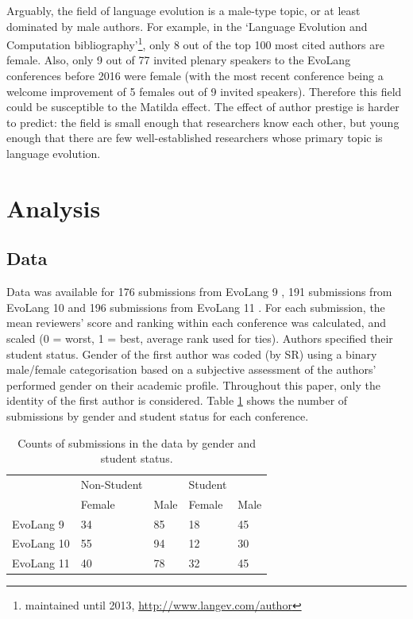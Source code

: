 \documentclass[12pt]{article}
\begin{document}
Arguably, the field of language evolution is a male-type topic, or at least dominated by male authors.  For example, in the `Language Evolution and Computation bibliography'\footnote{maintained until 2013, \url{http://www.langev.com/author}}, only 8 out of the top 100 most cited authors are female.  Also, only 9 out of 77 invited plenary speakers to the EvoLang conferences before 2016 were female (with the most recent conference being a welcome improvement of 5 females out of 9 invited speakers).  Therefore this field could be susceptible to the Matilda effect.  The effect of author prestige is harder to predict: the field is small enough that researchers know each other, but young enough that there are few well-established researchers whose primary topic is language evolution. 

\section{Analysis}

\subsection{Data}

Data was available for 176 submissions from EvoLang 9 \citep{scott2012evolution}, 191 submissions from EvoLang 10 \citep{cartmill2014evolution} and 196 submissions from EvoLang 11 \citep{roberts2016evolution}.  For each submission, the mean reviewers' score and ranking within each conference was calculated, and scaled (0 = worst, 1 = best, average rank used for ties).  Authors specified their student status.  Gender of the first author was coded (by SR) using a binary male/female categorisation based on a subjective assessment of the authors' performed gender on their academic profile.  Throughout this paper, only the identity of the first author is considered.  Table \ref{tab:count} shows the number of submissions by gender and student status for each conference. 

\begin{table}[htbp]
\begin{center}
\begin{tabular}{l | l l | l l}
	   & Non-Student & & Student & \\
         &    Female & Male & Female & Male\\
         \hline
  EvoLang 9  &34 & 85 & 18 & 45 \\
  EvoLang 10& 55& 94 &  12 & 30\\
  EvoLang 11& 40 &78   &32 & 45\\
\end{tabular}
\end{center}
\label{tab:count}
\caption{Counts of submissions in the data by gender and student status.}
\end{table}%
\end{document}
